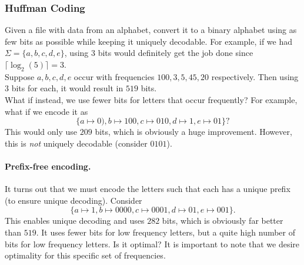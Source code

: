 

\subsubsection{Huffman Coding}

Given a file with data from an alphabet, convert it to a binary alphabet using as few bits as possible while keeping it uniquely decodable. For example, if we had $\Sigma=\{a,b,c,d,e\}$, using $3$ bits would definitely get the job done since $\lceil \log_2(5)\rceil = 3$.\\
Suppose $a,b,c,d,e$ occur with frequencies $100,3,5,45,20$ respectively. Then using $3$ bits for each, it would result in $519$ bits.\\
What if instead, we use fewer bits for letters that occur frequently? For example, what if we encode it as
\[ \{a\mapsto 0),b\mapsto 100,c\mapsto 010,d\mapsto 1,e\mapsto 01\}? \] This would only use $209$ bits, which is obviously a huge improvement. However, this is \textit{not} uniquely decodable (consider $0101$).\\

\paragraph{Prefix-free encoding.} It turns out that we must encode the letters such that each has a unique prefix (to ensure unique decoding). Consider
\[ \{a\mapsto 1, b\mapsto 0000, c\mapsto 0001, d\mapsto 01, e\mapsto 001\}. \]
This enables unique decoding and uses $282$ bits, which is obviously far better than $519$. It uses fewer bits for low frequency letters, but a quite high number of bits for low frequency letters. Is it optimal? It is important to note that we desire optimality for this specific set of frequencies.

